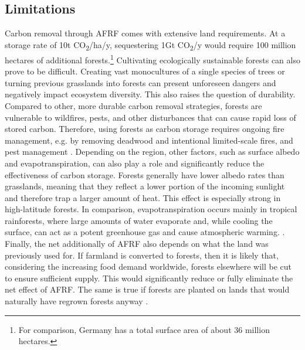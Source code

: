 \subsection*{Limitations}
Carbon removal through AFRF comes with extensive land requirements. At a storage rate of 10t CO\textsubscript{2}/ha/y, sequestering 1Gt CO\textsubscript{2}/y would require 100 million hectares of additional forests.\footnote{For comparison, Germany has a total surface area of about 36 million hectares.} Cultivating ecologically sustainable forests can also prove to be difficult. Creating vast monocultures of a single species of trees or turning previous grasslands into forests can present unforeseen dangers and negatively impact ecosystem diversity. This also raises the question of durability. Compared to other, more durable carbon removal strategies, forests are vulnerable to wildfires, pests, and other disturbances that can cause rapid loss of stored carbon. Therefore, using forests as carbon storage requires ongoing fire management, e.g. by removing deadwood and intentional limited-scale fires, and pest management \parencite{Watson2000LandForestry}. Depending on the region, other factors, such as surface albedo and evapotranspiration, can also play a role and significantly reduce the effectiveness of carbon storage. Forests generally have lower albedo rates than grasslands, meaning that they reflect a lower portion of the incoming sunlight and therefore trap a larger amount of heat. This effect is especially strong in high-latitude forests. In comparison, evapotranspiration occurs mainly in tropical rainforests, where large amounts of water evaporate and, while cooling the surface, can act as a potent greenhouse gas and cause atmospheric warming. \parencite{NRC2015ClimateSequestration}. Finally, the net additionally of AFRF also depends on what the land was previously used for. If farmland is converted to forests, then it is likely that, considering the increasing food demand worldwide, forests elsewhere will be cut to ensure sufficient supply. This would significantly reduce or fully eliminate the net effect of AFRF. The same is true if forests are planted on lands that would naturally have regrown forests anyway \parencite[128]{Gates2021HowDisaster}.\\
